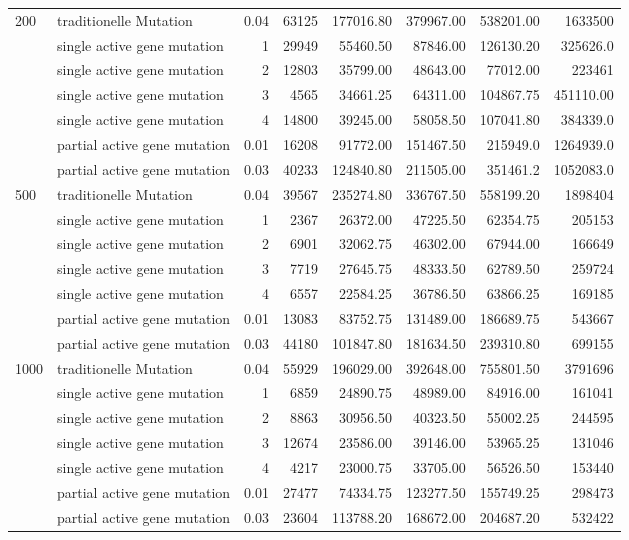 \begin{table}[!ht]
{\begin{tabular}{ |l|l|r||r|r|r|r|r|}
  \multirow{ 7 }{*}{200}
   & traditionelle Mutation & 0.04 & 63125 & 177016.80 & 379967.00 & 538201.00 & 1633500 \\
   & single active gene mutation & 1 & 29949 & 55460.50 & 87846.00 & 126130.20 & 325626.0 \\ 
   & single active gene mutation & 2 & 12803 & 35799.00 & 48643.00 & 77012.00 & 223461 \\
   & single active gene mutation & 3 & 4565 & 34661.25 & 64311.00 & 104867.75 & 451110.00 \\
   & single active gene mutation & 4 & 14800 & 39245.00 & 58058.50 & 107041.80 & 384339.0 \\
   & partial active gene mutation & 0.01 & 16208 & 91772.00 & 151467.50 & 215949.0 & 1264939.0 \\
   & partial active gene mutation & 0.03 & 40233 & 124840.80 & 211505.00 & 351461.2 & 1052083.0 \\
      \hline
   
  \multirow{ 7 }{*}{500}
   & traditionelle Mutation & 0.04 & 39567 & 235274.80 & 336767.50 & 558199.20 & 1898404 \\
   & single active gene mutation & 1 & 2367 & 26372.00 & 47225.50 & 62354.75 & 205153 \\ 
   & single active gene mutation & 2 & 6901 & 32062.75 & 46302.00 & 67944.00 & 166649 \\
   & single active gene mutation & 3 & 7719 & 27645.75 & 48333.50 & 62789.50 & 259724 \\
   & single active gene mutation & 4 & 6557 & 22584.25 & 36786.50 & 63866.25 & 169185 \\
   & partial active gene mutation & 0.01 & 13083 & 83752.75 & 131489.00 & 186689.75 & 543667 \\
   & partial active gene mutation & 0.03 & 44180 & 101847.80 & 181634.50 & 239310.80 & 699155 \\
      \hline
    
  \multirow{ 7 }{*}{1000} 
   & traditionelle Mutation & 0.04 & 55929 & 196029.00 & 392648.00 & 755801.50 & 3791696 \\
   & single active gene mutation & 1 & 6859 & 24890.75 & 48989.00 & 84916.00 & 161041 \\ 
   & single active gene mutation & 2 & 8863 & 30956.50 & 40323.50 & 55002.25 & 244595 \\
   & single active gene mutation & 3 & 12674 & 23586.00 & 39146.00 & 53965.25 & 131046 \\
   & single active gene mutation & 4 & 4217 & 23000.75 & 33705.00 & 56526.50 & 153440 \\
   & partial active gene mutation & 0.01 & 27477 & 74334.75 & 123277.50 & 155749.25 & 298473 \\
   & partial active gene mutation & 0.03 & 23604 & 113788.20 & 168672.00 & 204687.20 & 532422 \\
      \hline

\end{tabular}
}
\label{table_meta3}
\end{table}


